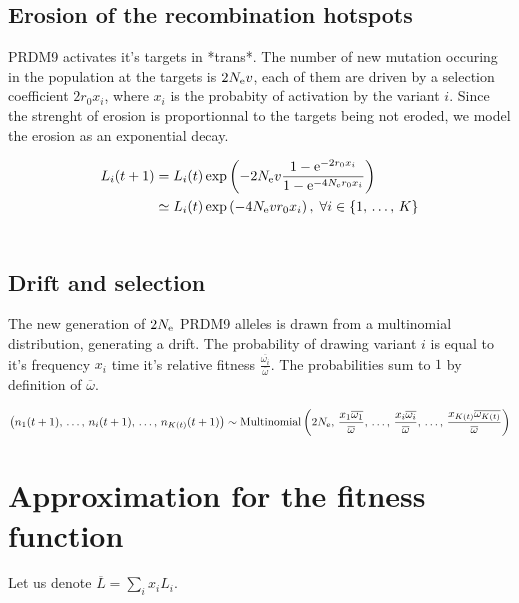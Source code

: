 \documentclass{article}
\begin{document}
\subsection{Erosion of the recombination hotspots} 

PRDM9 activates it's targets in *trans*. The number of new mutation occuring in the population at the targets is $2 N_\mathrm{e} v$, each of them are driven by a selection coefficient $2 r _0  x_i$, where $x_i$ is the probabity of activation by the variant $i$.
Since the strenght of erosion is proportionnal to the targets being not eroded, we model the erosion as an exponential decay.

\begin{equation}
  \begin{aligned}
 L_i (t+1) &=  L_i (t)\operatorname{exp} \left( - 2 N_\mathrm{e} v
 \dfrac{1 - \operatorname{e}^{-2 r _0  x_i}}{1 - \operatorname{e}^{-4 N_\mathrm{e} r _0  x_i}} \right)  \\
 &\simeq
    L_i (t)\operatorname{exp} \left( - 4 N_\mathrm{e} v
 r _0  x_i \right), \;
 \forall i \in \{ 1, \, \dots, \, K \} \\ \\
 \end{aligned}
\end{equation}


\subsection{Drift and selection} 

The new generation of $2 N_\mathrm{e}$ PRDM9 alleles is drawn from a multinomial distribution, generating a drift. The probability of drawing variant $i$ is equal to it's frequency $x_i$ time it's relative fitness  $\tfrac{\overline{\omega_i}}{\overline{\omega}}$. The probabilities sum to $1$ by definition of $\overline{\omega}$.

\begin{equation}
  \left(
  n_1(t+1), \,
  \dots, \,
  n_i(t+1), \,
  \dots, \,
  n_{K(t)}(t+1)
  \right)
  \sim \operatorname{Multinomial} \left(2 N_\mathrm{e}, \,
  \dfrac{x_1  \overline{\omega_1}}{\overline{\omega}}, \,
  \dots, \,
  \dfrac{x_i  \overline{\omega_i}}{\overline{\omega}}, \,
  \dots, \,
  \dfrac{x_{K(t)} \overline{\omega_{K(t)}}}{\overline{\omega}}
  \right)
\end{equation}


\section{Approximation for the fitness function}
Let us denote $\overline{L}=\sum_i x_i L_i$.
\end{document}
